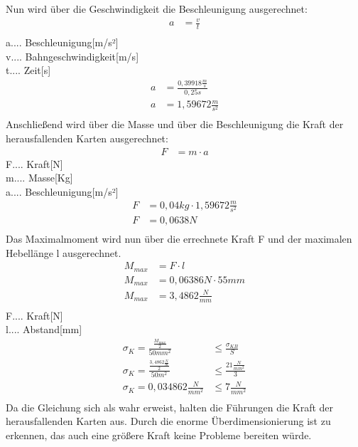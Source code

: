 Nun wird über die Geschwindigkeit die Beschleunigung ausgerechnet:
\begin{align*}
a &= \frac{v}{t}\\
\end{align*}
a.... Beschleunigung[m/s²]\\
v.... Bahngeschwindigkeit[m/s]\\
t.... Zeit[s]\\
\begin{align*}
a &= \frac{0,39918\tfrac{m}{s}}{0,25s}\\
a &= 1,59672\tfrac{m}{s^{2}}\\
\end{align*}
Anschließend wird über die Masse und über die Beschleunigung die Kraft der herausfallenden Karten ausgerechnet:
\begin{align*}
F &= m \cdot a
\end{align*}
F.... Kraft[N]\\
m.... Masse[Kg]\\
a.... Beschleunigung[m/s²]\\
\begin{align*}
F &= 0,04 kg \cdot 1,59672\tfrac{m}{s^{2}}\\
F &= 0,0638N\\
\end{align*}
Das Maximalmoment wird nun über die errechnete Kraft F und der maximalen Hebellänge l ausgerechnet.
\begin{align*}
M_{max} &= F\cdot l\\
M_{max} &= 0,06386N\cdot 55mm\\
M_{max} &= 3,4862\tfrac{N}{mm}\\
\end{align*}
F.... Kraft[N]\\
l.... Abstand[mm]\\

\begin{align*}
\sigma _{K} = {\frac{\frac{M_{max}}{2}}{50mm^{2}}} &\leq \frac{\sigma _{KB}}{S}\\
\sigma _{K}= \frac{\frac{3,4862\tfrac{N}{m}}{2}}{50m^{2}} &\leq  \frac{21 \tfrac{N}{mm^{2}}}{3}\\
\sigma _{K} = 0,034862 \tfrac{N}{mm^{2}} &\leq 7 \tfrac{N}{mm^{2}}\\
\end{align*}
Da die Gleichung sich als wahr erweist, halten die Führungen die Kraft der herausfallenden Karten
aus.
Durch die enorme Überdimensionierung ist zu erkennen, das auch eine größere Kraft
keine Probleme bereiten würde.

